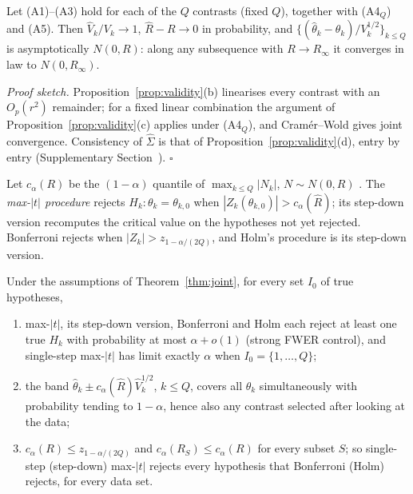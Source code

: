 \begin{theorem}\label{thm:joint}
Let (A1)--(A3) hold for each of the $Q$ contrasts (fixed $Q$), together with (A4$_Q$) and (A5). Then $\hat V_k/V_k\to1$, $\hat R-R\to0$ in probability, and $\{(\hat\theta_k-\theta_k)/V_k^{1/2}\}_{k\le Q}$ is asymptotically $N(0,R)$: along any subsequence with $R\to R_\infty$ it converges in law to $N(0,R_\infty)$.
\end{theorem}

\emph{Proof sketch.} Proposition~\ref{prop:validity}(b) linearises every contrast with an $O_p(r^2)$ remainder; for a fixed linear combination the argument of Proposition~\ref{prop:validity}(c) applies under (A4$_Q$), and Cram\'er--Wold gives joint convergence. Consistency of $\hat\Sigma$ is that of Proposition~\ref{prop:validity}(d), entry by entry (Supplementary Section~). $\square$

Let $c_\alpha(R)$ be the $(1-\alpha)$ quantile of $\max_{k\le Q}|N_k|$, $N\sim N(0,R)$ \citep{genz2009,hothorn2008}. The \emph{max-$|t|$ procedure} rejects $H_k:\theta_k=\theta_{k,0}$ when $|Z_k(\theta_{k,0})|>c_\alpha(\hat R)$; its step-down version \citep{romano2005stepdown} recomputes the critical value on the hypotheses not yet rejected. Bonferroni rejects when $|Z_k|>z_{1-\alpha/(2Q)}$, and Holm's procedure \citep{holm1979} is its step-down version.

\begin{theorem}\label{thm:fwer}
Under the assumptions of Theorem~\ref{thm:joint}, for every set $I_0$ of true hypotheses,
\begin{enumerate}
\item[(a)] max-$|t|$, its step-down version, Bonferroni and Holm each reject at least one true $H_k$ with probability at most $\alpha+o(1)$ (strong FWER control), and single-step max-$|t|$ has limit exactly $\alpha$ when $I_0=\{1,\dots,Q\}$;
\item[(b)] the band $\hat\theta_k\pm c_\alpha(\hat R)\hat V_k^{1/2}$, $k\le Q$, covers all $\theta_k$ simultaneously with probability tending to $1-\alpha$, hence also any contrast selected after looking at the data;
\item[(c)] $c_\alpha(R)\le z_{1-\alpha/(2Q)}$ and $c_\alpha(R_S)\le c_\alpha(R)$ for every subset $S$; so single-step (step-down) max-$|t|$ rejects every hypothesis that Bonferroni (Holm) rejects, for every data set.
\end{enumerate}
\end{theorem}

